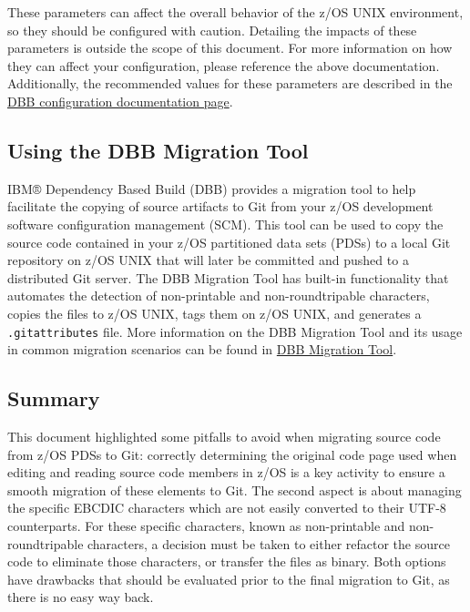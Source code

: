 \documentclass[
  letterpaper,
  DIV=11,
  numbers=noendperiod]{scrartcl}
\begin{document}
These parameters can affect the overall behavior of the z/OS UNIX
environment, so they should be configured with caution. Detailing the
impacts of these parameters is outside the scope of this document. For
more information on how they can affect your configuration, please
reference the above documentation. Additionally, the recommended values
for these parameters are described in the
\href{https://www.ibm.com/docs/en/dbb/2.0?topic=SS6T76_2.0.0/setup_git_on_uss.htm}{DBB
configuration documentation page}.

\hypertarget{using-the-dbb-migration-tool}{%
\subsection{Using the DBB Migration
Tool}\label{using-the-dbb-migration-tool}}

IBM® Dependency Based Build (DBB) provides a migration tool to help
facilitate the copying of source artifacts to Git from your z/OS
development software configuration management (SCM). This tool can be
used to copy the source code contained in your z/OS partitioned data
sets (PDSs) to a local Git repository on z/OS UNIX that will later be
committed and pushed to a distributed Git server. The DBB Migration Tool
has built-in functionality that automates the detection of non-printable
and non-roundtripable characters, copies the files to z/OS UNIX, tags
them on z/OS UNIX, and generates a \texttt{.gitattributes} file. More
information on the DBB Migration Tool and its usage in common migration
scenarios can be found in \href{./dbb-migration-tool.md}{DBB Migration
Tool}.

\hypertarget{summary}{%
\subsection{Summary}\label{summary}}

This document highlighted some pitfalls to avoid when migrating source
code from z/OS PDSs to Git: correctly determining the original code page
used when editing and reading source code members in z/OS is a key
activity to ensure a smooth migration of these elements to Git. The
second aspect is about managing the specific EBCDIC characters which are
not easily converted to their UTF-8 counterparts. For these specific
characters, known as non-printable and non-roundtripable characters, a
decision must be taken to either refactor the source code to eliminate
those characters, or transfer the files as binary. Both options have
drawbacks that should be evaluated prior to the final migration to Git,
as there is no easy way back.
\end{document}
